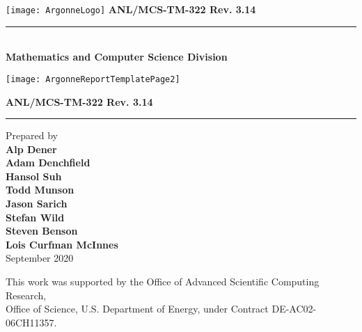 
\pagestyle{empty}
\hspace{-.65in}\texttt{[image: ArgonneLogo]}
\hfill  {\large {\bf ANL/MCS-TM-322 Rev. 3.14}}

\vspace*{2in}
\vspace*{8pt}
\hrule
\vspace*{8pt}

\vspace*{1in}
\noindent \\
{\Large {\bf Mathematics and Computer Science Division}}

\vspace*{10pt}


\vspace*{20pt}


\newpage
{}
\centerline{\texttt{[image: ArgonneReportTemplatePage2]}}
\newpage
\restoregeometry


\pagestyle{empty}
\hfill {\large {\bf ANL/MCS-TM-322 Rev. 3.14}}

\vspace*{2in}
\vspace*{8pt}
\hrule
\vspace*{8pt}

\vspace*{0.5in}
\noindent Prepared by \\
{\bf Alp Dener \\ Adam Denchfield \\ Hansol Suh \\ Todd Munson \\ Jason Sarich \\ Stefan Wild \\ Steven Benson \\ Lois Curfman McInnes}\\

\vspace*{30pt}
\noindent September 2020

\vspace*{20pt}
\noindent This work was supported by the Office of Advanced Scientific Computing Research, \\
Office of Science, U.S. Department of Energy, under Contract DE-AC02-06CH11357.
